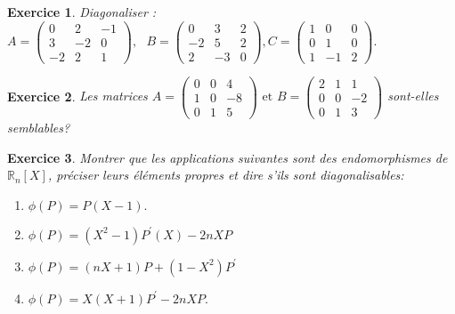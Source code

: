 \documentclass[12pt,a4paper]{article}
\newcommand{\R}{\mathbb{R}}
\theoremstyle{break}
\theoremstyle{break}
\newtheorem{Exo}{Exercice}
\begin{document}
\begin{Exo}
	Diagonaliser :
	$A=\left(\begin{array}{ccc}
		0&2&-1\\
		3&-2&0\\
		-2&2&1
	\end{array}\right),\textrm{ } B=\left(\begin{array}{ccc}
		0&3&2\\
		-2&5&2\\
		2&-3&0
	\end{array}\right), C=\left(\begin{array}{ccc}
		1&0&0\\
		0&1&0\\
		1&-1&2
	\end{array}\right).$
\end{Exo}

\begin{Exo}
	Les matrices 
	$A=\left(\begin{array}{ccc}
		0&0&4\\
		1&0&-8\\
		0&1&5
	\end{array}\right)\textrm{ et }
	B=\left(\begin{array}{ccc}
		2&1&1\\
		0&0&-2\\
		0&1&3
	\end{array}\right)$
	sont-elles semblables?
\end{Exo}

\begin{Exo}
	Montrer que les applications suivantes sont des endomorphismes de $
\R_{n}\left[ X\right] $, pr\'{e}ciser leurs \'{e}l\'{e}ments propres et
dire s'ils sont diagonalisables:
\begin{multicols}{2}
\begin{enumerate}
\item  $\phi \left( P\right) =P\left( X-1\right) .$

\item  $\phi \left( P\right) =\left( X^{2}-1\right) P^{\prime }\left(
X\right) -2nXP$

\item  $\phi \left( P\right) =\left( nX+1\right) P+\left( 1-X^{2}\right)
P^{\prime }$

\item  $\phi \left( P\right) =X\left( X+1\right) P^{\prime }-2nXP.$
\end{enumerate}
\end{multicols}
\end{Exo}
\end{document}
